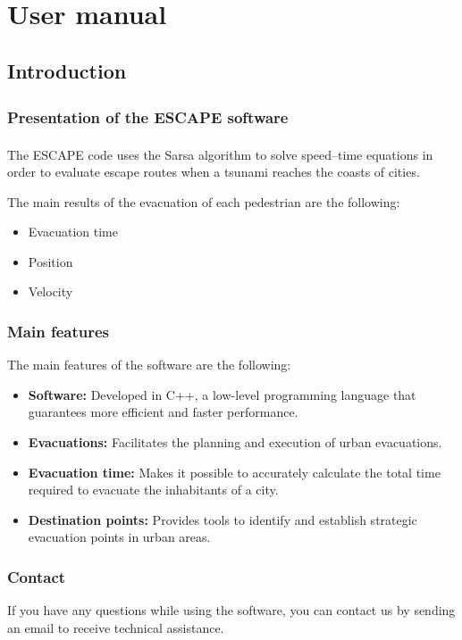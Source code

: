 \documentclass[12pt,a4paper]{book}
\newcommand{\escape}{ESCAPE\textsuperscript{\textregistered}}
\begin{document}
\part{User manual}

\chapter{Introduction}

\section{Presentation of the \texorpdfstring{\escape{}}{ESCAPE} software}
The \escape{} code uses the Sarsa algorithm to solve speed--time equations in order to evaluate
escape routes when a tsunami reaches the coasts of cities.

The main results of the evacuation of each pedestrian are the following:
\begin{itemize}
  \item Evacuation time
  \item Position
  \item Velocity
\end{itemize}

\section{Main features}
The main features of the software are the following:
\begin{itemize}
  \item \textbf{Software:} Developed in C++, a low-level programming language that guarantees more
    efficient and faster performance.
  \item \textbf{Evacuations:} Facilitates the planning and execution of urban evacuations.
  \item \textbf{Evacuation time:} Makes it possible to accurately calculate the total time required
    to evacuate the inhabitants of a city.
  \item \textbf{Destination points:} Provides tools to identify and establish strategic evacuation
    points in urban areas.
\end{itemize}

\section{Contact}
If you have any questions while using the software, you can contact us by sending an email to
receive technical assistance.
\end{document}
